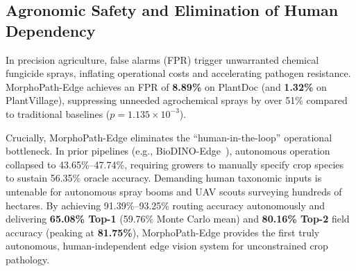 \subsection{Agronomic Safety and Elimination of Human Dependency}
\label{subsec:discussion_phenotypic_overlap}
In precision agriculture, false alarms (FPR) trigger unwarranted chemical fungicide sprays, inflating operational costs and accelerating pathogen resistance. MorphoPath-Edge achieves an FPR of \textbf{8.89\%} on PlantDoc (and \textbf{1.32\%} on PlantVillage), suppressing unneeded agrochemical sprays by over 51\% compared to traditional baselines ($p = 1.135 \times 10^{-3}$).

Crucially, MorphoPath-Edge eliminates the ``human-in-the-loop'' operational bottleneck. In prior pipelines (e.g., BioDINO-Edge~\cite{alsaadi2026biodino}), autonomous operation collapsed to 43.65\%--47.74\%, requiring growers to manually specify crop species to sustain 56.35\% oracle accuracy. Demanding human taxonomic inputs is untenable for autonomous spray booms and UAV scouts surveying hundreds of hectares. By achieving 91.39\%--93.25\% routing accuracy autonomously and delivering \textbf{65.08\% Top-1} (59.76\% Monte Carlo mean) and \textbf{80.16\% Top-2} field accuracy (peaking at \textbf{81.75\%}), MorphoPath-Edge provides the first truly autonomous, human-independent edge vision system for unconstrained crop pathology.